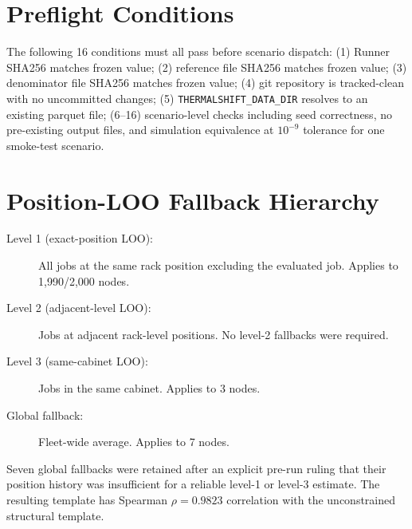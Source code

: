 \documentclass[acmsmall,screen,review,anonymous]{acmart}
\begin{document}





\appendix

\section{Preflight Conditions}

The following 16 conditions must all pass before scenario dispatch:
(1) Runner SHA256 matches frozen value;
(2) reference file SHA256 matches frozen value;
(3) denominator file SHA256 matches frozen value;
(4) git repository is tracked-clean with no uncommitted changes;
(5) \texttt{THERMALSHIFT\_DATA\_DIR} resolves to an existing parquet file;
(6--16) scenario-level checks including seed correctness, no pre-existing output files,
and simulation equivalence at $10^{-9}$ tolerance for one smoke-test scenario.

\section{Position-LOO Fallback Hierarchy}

\begin{description}
  \item[Level 1 (exact-position LOO):] All jobs at the same rack position excluding
    the evaluated job.  Applies to 1,990/2,000 nodes.
  \item[Level 2 (adjacent-level LOO):] Jobs at adjacent rack-level positions.
    No level-2 fallbacks were required.
  \item[Level 3 (same-cabinet LOO):] Jobs in the same cabinet.  Applies to 3 nodes.
  \item[Global fallback:] Fleet-wide average.  Applies to 7 nodes.
\end{description}

Seven global fallbacks were retained after an explicit pre-run ruling that their
position history was insufficient for a reliable level-1 or level-3 estimate.
The resulting template has Spearman $\rho = 0.9823$ correlation with the
unconstrained structural template.
\end{document}
